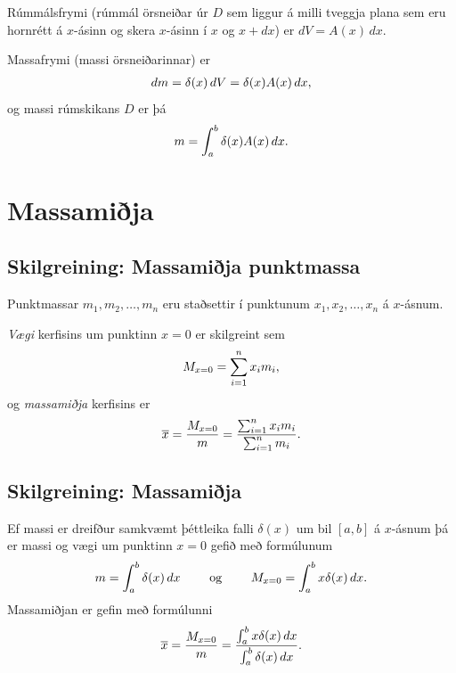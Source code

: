 \documentclass[b5paper,10pt,icelandic]{sphinxmanual}
\begin{document}
Rúmmálsfrymi (rúmmál örsneiðar úr \(D\) sem liggur á milli tveggja
plana sem eru hornrétt á \(x\)-ásinn og skera \(x\)-ásinn í
\(x\) og \(x+dx\)) er \(dV=A(x)\, dx\).

Massafrymi (massi örsneiðarinnar) er
\begin{gather}
\begin{split}dm=\delta(x)\, dV = \delta(x) A(x)\, dx,\end{split}\notag
\end{gather}
og massi rúmskikans \(D\) er þá
\begin{gather}
\begin{split}m=\int_a^b \delta(x)A(x)\, dx.\end{split}\notag
\end{gather}

\section{Massamiðja}
\label{kafli07:index-13}\label{kafli07:massamija}

\subsection{Skilgreining: Massamiðja punktmassa}
\label{kafli07:skilgreining-massamija-punktmassa}
Punktmassar \(m_1, m_2, \ldots, m_n\) eru staðsettir í punktunum
\(x_1,
x_2, \ldots, x_n\) á \(x\)-ásnum.

\textit{Vægi} kerfisins um punktinn \(x=0\) er skilgreint sem
\begin{gather}
\begin{split}M_{x=0}=\sum_{i=1}^n x_im_i,\end{split}\notag
\end{gather}
og \textit{massamiðja} kerfisins er
\begin{gather}
\begin{split}\overline{x}=\frac{M_{x=0}}{m} = \frac{\sum_{i=1}^n x_im_i}{\sum_{i=1}^n m_i}.\end{split}\notag
\end{gather}

\subsection{Skilgreining: Massamiðja}
\label{kafli07:skilgreining-massamija}
Ef massi er dreifður samkvæmt þéttleika falli \(\delta(x)\) um bil
\([a, b]\) á \(x\)-ásnum þá er massi og vægi um punktinn
\(x=0\) gefið með formúlunum
\begin{gather}
\begin{split}m=\int_a^b \delta(x)\,dx
\qquad\mbox{ og }\qquad
M_{x=0}= \int_a^b x\delta(x)\,dx.\end{split}\notag
\end{gather}
Massamiðjan er gefin með formúlunni
\begin{gather}
\begin{split}\overline{x}=\frac{M_{x=0}}{m}   =
\frac{\int_a^b x\delta(x)\,dx}{\int_a^b \delta(x)\,dx}.\end{split}\notag
\end{gather}
\end{document}
